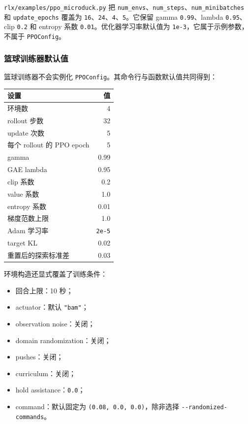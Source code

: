 \documentclass[
  chinese,
  11pt,
  letterpaper,
]{article}
\newcounter{none} %
\providecommand{\tightlist}{%
  \setlength{\itemsep}{0pt}\setlength{\parskip}{0pt}}
\begin{document}
\texttt{rlx/\allowbreak{}examples\allowbreak{}/\allowbreak{}ppo\_\allowbreak{}microduc\allowbreak{}k.py}
把
\texttt{num\_envs}、\texttt{num\_steps}、\texttt{num\_\allowbreak{}minibatc\allowbreak{}hes}
和 \texttt{update\_\allowbreak{}epochs} 覆盖为
\texttt{16}、\texttt{24}、\texttt{4}、\texttt{5}。它保留 gamma
\texttt{0.99}、lambda \texttt{0.95}、clip \texttt{0.2} 和 entropy 系数
\texttt{0.01}。优化器学习率默认值为
\texttt{1e-3}，它属于示例参数，不属于 \texttt{PPOConfig}。

\subsubsection{篮球训练器默认值}\label{ux7beeux7403ux8badux7ec3ux5668ux9ed8ux8ba4ux503c}

篮球训练器不会实例化 \texttt{PPOConfig}。其命令行与函数默认值共同得到：

{\def\LTcaptype{none} %
\begin{longtable}[]{@{}lr@{}}
\toprule\noalign{}
设置 & 值 \\
\midrule\noalign{}
\endhead
\bottomrule\noalign{}
\endlastfoot
环境数 & 4 \\
rollout 步数 & 32 \\
update 次数 & 5 \\
每个 rollout 的 PPO epoch & 5 \\
gamma & 0.99 \\
GAE lambda & 0.95 \\
clip 系数 & 0.2 \\
value 系数 & 1.0 \\
entropy 系数 & 0.01 \\
梯度范数上限 & 1.0 \\
Adam 学习率 & \texttt{2e-5} \\
target KL & 0.02 \\
重置后的探索标准差 & 0.03 \\
\end{longtable}
}

环境构造还显式覆盖了训练条件：

\begin{itemize}
\tightlist
\item
  回合上限：10 秒；
\item
  actuator：默认 \texttt{"bam"}；
\item
  observation noise：关闭；
\item
  domain randomization：关闭；
\item
  pushes：关闭；
\item
  curriculum：关闭；
\item
  hold assistance：\texttt{0.0}；
\item
  command：默认固定为 \texttt{(0.08,\ 0.0,\ 0.0)}，除非选择
  \texttt{-\allowbreak{}-\allowbreak{}randomiz\allowbreak{}ed-\allowbreak{}commands\allowbreak{}}。
\end{itemize}
\end{document}
